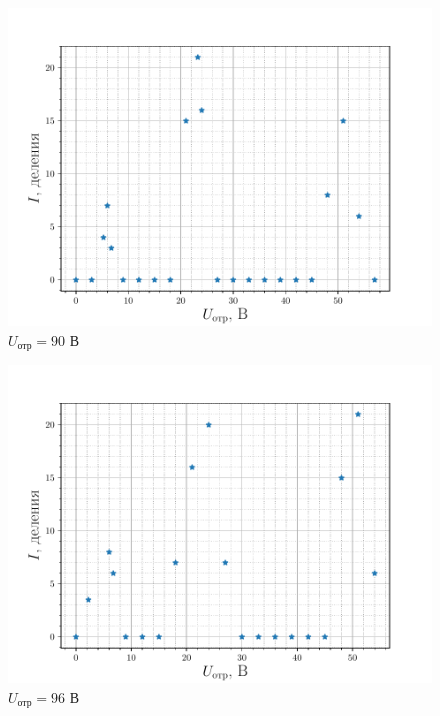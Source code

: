 \begin{figure}[H]
		\centering
		\includegraphics[height=0.4\textheight]{fig/res90V_1}
		\caption{$U_{\text{отр}}=90$ В}
		\label{fig:res90V_1}
\end{figure}
\begin{figure}[H]
		\centering
		\includegraphics[height=0.4\textheight]{fig/res96V_1}
		\caption{$U_{\text{отр}}=96$ В}
		\label{fig:res96V_1}
\end{figure}
